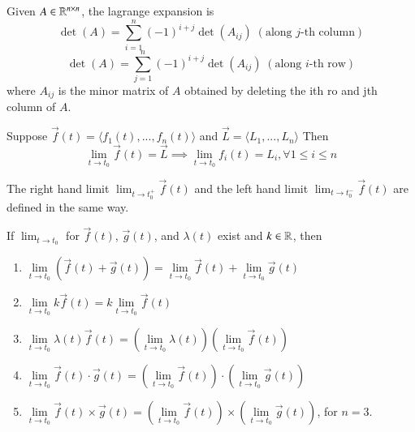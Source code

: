 \documentclass[12pt, a4paper, oneside, openright, titlepage]{book}
\begin{document}
\begin{appendices}
    \begin{rec}
        Given $A \in \mathbb R^{n\times n}$, the lagrange expansion is \begin{equation}
            \det(A) = \sum\limits_{i=1}^n(-1)^{i+j}\det(A_{ij})\;(\text{along $j$-th column})
        \end{equation}
        \begin{equation}
            \det(A) = \sum\limits_{j=1}^n(-1)^{i+j}\det(A_{ij})\;(\text{along $i$-th row})
        \end{equation}
        where $A_{ij}$ is the minor matrix of $A$ obtained by deleting the ith ro and jth column of $A$.
    \end{rec}

    \begin{defn}
        Suppose $\vec{f}(t) = \langle f_1(t),...,f_n(t)\rangle$ and $\vec{L} = \langle L_1,...,L_n\rangle$ Then \begin{equation}
            \lim\limits_{t\rightarrow t_0}\vec{f}(t) = \vec{L} \implies \lim\limits_{t\rightarrow t_0}f_i(t) = L_i, \forall 1\leq i \leq n
        \end{equation}
    \end{defn}

    \begin{rmk}
        The right hand limit $\lim_{t\rightarrow t_0^+}\vec{f}(t)$ and the left hand limit $\lim_{t\rightarrow t_0^-}\vec{f}(t)$ are defined in the same way.
    \end{rmk}

    \begin{rmk}
        If $\lim_{t\rightarrow t_0}$ for $\vec{f}(t)$, $\vec{g}(t)$, and $\lambda(t)$ exist and $k \in \mathbb R$, then \begin{enumerate}
            \item $\lim\limits_{t\rightarrow t_0}(\vec{f}(t)+\vec{g}(t)) = \lim\limits_{t\rightarrow t_0}\vec{f}(t) + \lim\limits_{t\rightarrow t_0}\vec{g}(t)$
            \item $\lim\limits_{t\rightarrow t_0}k\vec{f}(t) = k\lim\limits_{t\rightarrow t_0}\vec{f}(t)$
            \item $\lim\limits_{t\rightarrow t_0}\lambda(t)\vec{f}(t) = (\lim\limits_{t\rightarrow t_0}\lambda(t))(\lim\limits_{t\rightarrow t_0}\vec{f}(t))$
            \item $\lim\limits_{t\rightarrow t_0}\vec{f}(t)\cdot \vec{g}(t) = (\lim\limits_{t\rightarrow t_0}\vec{f}(t))\cdot(\lim\limits_{t\rightarrow t_0}\vec{g}(t))$
            \item $\lim\limits_{t\rightarrow t_0}\vec{f}(t)\times \vec{g}(t) = (\lim\limits_{t\rightarrow t_0}\vec{f}(t))\times(\lim\limits_{t\rightarrow t_0}\vec{g}(t))$, for $n = 3$.
        \end{enumerate}
    \end{rmk}



\end{appendices}
\end{document}
